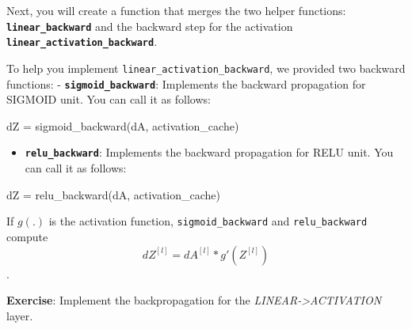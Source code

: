 \documentclass[11pt]{article}
\providecommand{\tightlist}{%
      \setlength{\itemsep}{0pt}\setlength{\parskip}{0pt}}
\newenvironment{Shaded}{}{}
\newcommand{\NormalTok}[1]{{#1}}
\newcommand{\OperatorTok}[1]{\textcolor[rgb]{0.40,0.40,0.40}{{#1}}}
\begin{document}
Next, you will create a function that merges the two helper functions:
\textbf{\texttt{linear\_backward}} and the backward step for the
activation \textbf{\texttt{linear\_activation\_backward}}.

To help you implement \texttt{linear\_activation\_backward}, we provided
two backward functions: - \textbf{\texttt{sigmoid\_backward}}:
Implements the backward propagation for SIGMOID unit. You can call it as
follows:

\begin{Shaded}
\begin{Highlighting}[]
\NormalTok{dZ }\OperatorTok{=}\NormalTok{ sigmoid_backward(dA, activation_cache)}
\end{Highlighting}
\end{Shaded}

\begin{itemize}
\tightlist
\item
  \textbf{\texttt{relu\_backward}}: Implements the backward propagation
  for RELU unit. You can call it as follows:
\end{itemize}

\begin{Shaded}
\begin{Highlighting}[]
\NormalTok{dZ }\OperatorTok{=}\NormalTok{ relu_backward(dA, activation_cache)}
\end{Highlighting}
\end{Shaded}

If \(g(.)\) is the activation function, \texttt{sigmoid\_backward} and
\texttt{relu\_backward} compute
\[dZ^{[l]} = dA^{[l]} * g'(Z^{[l]}) \tag{11}\].

\textbf{Exercise}: Implement the backpropagation for the
\emph{LINEAR-\textgreater{}ACTIVATION} layer.
\end{document}
